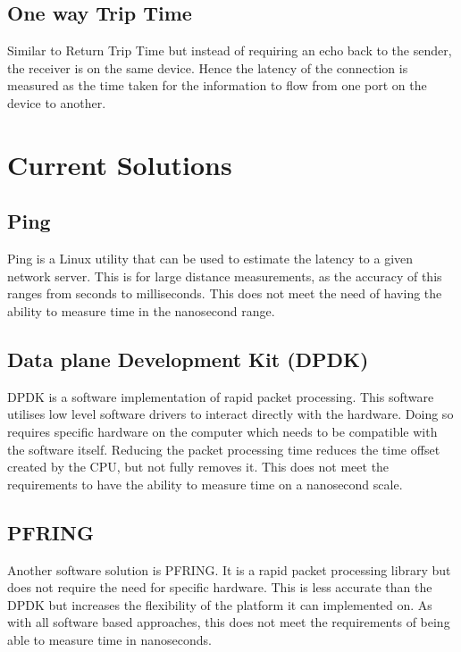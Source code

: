 \subsection{One way Trip Time}

Similar to Return Trip Time but instead of requiring an echo back to the sender, the receiver is on the
same device. Hence the latency of the connection is measured as the time taken for the information
to flow from one port on the device to another.

\section{Current Solutions}

\subsection{Ping}

Ping is a Linux utility that can be used to estimate the latency to a given network server. This is for
large distance measurements, as the accuracy of this ranges from seconds to milliseconds. This does
not meet the need of having the ability to measure time in the nanosecond range.

\subsection{Data plane Development Kit (DPDK)}

DPDK is a software implementation of rapid packet processing. This software utilises low level
software drivers to interact directly with the hardware. Doing so requires specific hardware on the
computer which needs to be compatible with the software itself. Reducing the packet processing
time reduces the time offset created by the CPU, but not fully removes it. This does not meet the
requirements to have the ability to measure time on a nanosecond scale.

\subsection{PF\textunderscore RING}

Another software solution is PF\textunderscore RING. It is a rapid packet processing library but does not require the
need for specific hardware. This is less accurate than the DPDK but increases the flexibility of the
platform it can implemented on. As with all software based approaches, this does not meet the
requirements of being able to measure time in nanoseconds.

